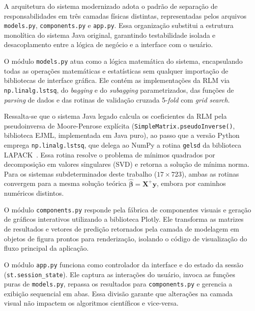 A arquitetura do sistema modernizado adota o padrão de separação de responsabilidades em três camadas físicas distintas, representadas pelos arquivos \texttt{models.py}, \texttt{components.py} e \texttt{app.py}. Essa organização substitui a estrutura monolítica do sistema Java original, garantindo testabilidade isolada e desacoplamento entre a lógica de negócio e a interface com o usuário.

O módulo \texttt{models.py} atua como a lógica matemática do sistema, encapsulando todas as operações matemáticas e estatísticas sem qualquer importação de bibliotecas de interface gráfica. Ele contém as implementações da RLM via \texttt{np.linalg.lstsq}, do \textit{bagging} e do \textit{subagging} parametrizados, das funções de \textit{parsing} de dados e das rotinas de validação cruzada 5-\textit{fold} com \textit{grid search}.

Ressalta-se que o sistema Java legado calcula os coeficientes da RLM pela
pseudoinversa de Moore-Penrose explícita (\texttt{SimpleMatrix.pseudoInverse()},
biblioteca EJML, implementada em Java puro), ao passo que a versão Python emprega
\texttt{np.linalg.lstsq}, que delega ao NumPy a rotina \texttt{gelsd} da
biblioteca LAPACK~\cite{anderson1999lapack}. Essa rotina resolve o problema de mínimos quadrados por
decomposição em valores singulares (SVD) e retorna a solução de mínima norma.
Para os sistemas subdeterminados deste trabalho ($17 \times 723$), ambas as
rotinas convergem para a mesma solução teórica
$\widehat{\boldsymbol{\beta}} = \mathbf{X}^{+}\mathbf{y}$, embora por caminhos
numéricos distintos.

O módulo \texttt{components.py} responde pela fábrica de componentes visuais e geração de gráficos interativos utilizando a biblioteca Plotly. Ele transforma as matrizes de resultados e vetores de predição retornados pela camada de modelagem em objetos de figura prontos para renderização, isolando o código de visualização do fluxo principal da aplicação.

O módulo \texttt{app.py} funciona como controlador da interface e do estado da sessão (\texttt{st.session\_state}). Ele captura as interações do usuário, invoca as funções puras de \texttt{models.py}, repassa os resultados para \texttt{components.py} e gerencia a exibição sequencial em abas. Essa divisão garante que alterações na camada visual não impactem os algoritmos científicos e vice-versa.


